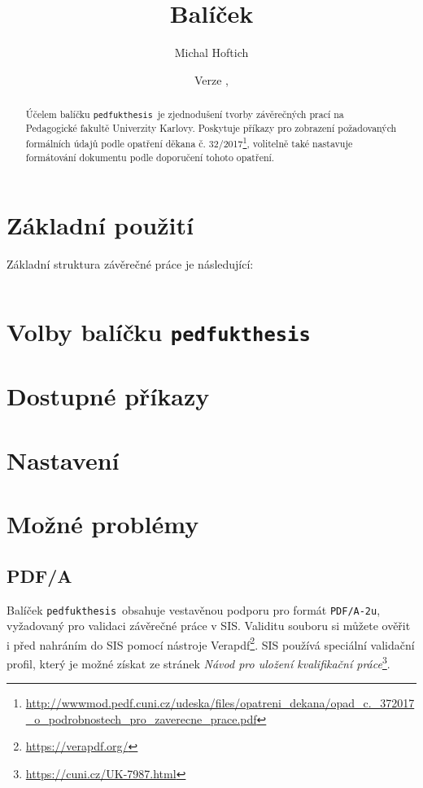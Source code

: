 \documentclass{ltxdoc}
\title{Balíček \pkgname}
\author{Michal Hoftich}
\date{Verze \version, \gitdate}
\newcommand\pkgname{\texttt{pedfukthesis}}
\begin{document}
\maketitle

\begin{abstract}
\noindent Účelem balíčku \pkgname\ je zjednodušení tvorby závěrečných prací na
Pedagogické fakultě Univerzity Karlovy. Poskytuje příkazy pro zobrazení
požadovaných formálních údajů podle opatření děkana č.
32/2017\footnote{\url{http://wwwmod.pedf.cuni.cz/udeska/files/opatreni_dekana/opad_c._372017_o_podrobnostech_pro_zaverecne_prace.pdf}},
volitelně také nastavuje formátování dokumentu podle doporučení tohoto
opatření.
\end{abstract}

\tableofcontents

\section{Základní použití}

Základní struktura závěrečné práce je následující:

\inputminted{latex}{example/basic.tex}



\section{Volby balíčku \pkgname}

\section{Dostupné příkazy}

\section{Nastavení}

\section{Možné problémy}
\subsection{PDF/A}
Balíček \pkgname\ obsahuje vestavěnou podporu pro formát \texttt{PDF/A-2u},
vyžadovaný pro validaci závěrečné práce v SIS. Validitu souboru si můžete
ověřit i před nahráním do SIS pomocí nástroje
Verapdf\footnote{\url{https://verapdf.org/}}. SIS používá speciální validační
profil, který je možné získat ze stránek
\textit{Návod pro uložení kvalifikační práce}\footnote{\url{https://cuni.cz/UK-7987.html}}.
\end{document}
